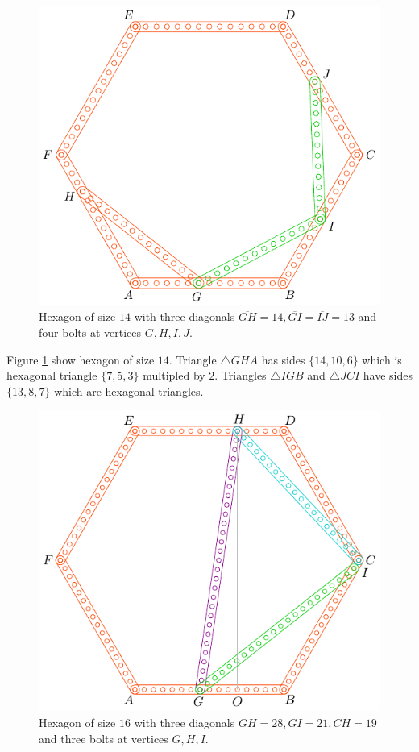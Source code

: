 \documentclass[11pt]{article}
\begin{document}
\begin{figure}[H]
\centering
\includegraphics[scale=1]{14/hexa-14a}
\caption{Hexagon of size $14$ with three diagonals $\overline{GH} = 14, \overline{GI} = \overline{IJ} = 13$ and four bolts at vertices $G,H,I,J$.}
\label{fig:14a}
\end{figure}

Figure \ref{fig:14a} show hexagon of size $14$. Triangle $\triangle{GHA}$ has sides $\{14,10,6\}$ which is hexagonal triangle $\{7,5,3\}$ multipled by $2$. Triangles $\triangle{IGB}$ and $\triangle{JCI}$ have sides $\{13,8,7\}$ which are hexagonal triangles.


\begin{figure}[H]
\centering
\includegraphics[scale=1]{16/hexa-16a}
\caption{Hexagon of size $16$ with three diagonals $\overline{GH} = 28, \overline{GI} = 21, \overline{CH} = 19$ and three bolts at vertices $G,H,I$.}
\label{fig:16a}
\end{figure}
\end{document}
